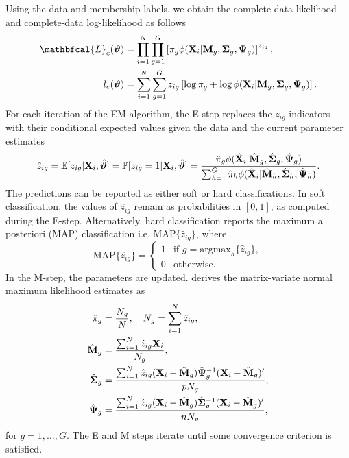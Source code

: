 \documentclass[12pt]{report}
\begin{document}
Using the data and membership labels, we obtain the complete-data likelihood and complete-data log-likelihood as follows
\begin{align*}
\mathbfcal{L}_c(\bm{\vartheta}) &= \prod_{i=1}^N \prod_{g=1}^G \left[ \pi_g \phi({\bf X}_i | {\bf M}_g, {\bf \Sigma}_g, {\bf \Psi}_g) \right] ^{z_{ig}}, \\
l_c(\bm{\vartheta}) &= \sum_{i=1}^N \sum_{g=1}^G z_{ig} \left[ \log \pi_g + \log \phi({\bf X}_i | {\bf M}_g, {\bf \Sigma}_g, {\bf \Psi}_g) \right].
\end{align*}
For each iteration of the EM algorithm, the E-step replaces the $z_{ig}$ indicators with their conditional expected values given the data and the current parameter estimates
\begin{equation*}
\hat{z}_{ig} = \mathbb{E}[z_{ig} | {\bf X}_i, \hat{\bm{\vartheta}}] = \mathbb{P}[z_{ig} = 1 | {\bf X}_i, \hat{\bm{\vartheta}}] = \frac{\hat{\pi}_g \phi(\hat{\bf {X}}_i |\hat{\bf {M}}_g, \hat{\bf {\Sigma}}_g, \hat{\bf{\Psi}}_g)}{\sum_{h=1}^G \hat{\pi}_h \phi(\hat{\bf {X}}_i |\hat{\bf {M}}_h, \hat{\bf {\Sigma}}_h, \hat{\bf{\Psi}}_h)}.
\end{equation*}
The predictions can be reported as either soft or hard classifications. In soft classification, the values of $\hat{z}_{ig}$ remain as probabilities in $[0, 1]$, as computed during the E-step. Alternatively, hard classification reports the maximum a posteriori (MAP) classification i.e, $\text{MAP}\{ \hat{z}_{ig}\}$, where 
\begin{equation*}
\text{MAP}\{ \hat{z}_{ig}\} = 
\begin{cases}
    1 & \text{if $g = \text{argmax}_h \{ \hat{z}_{ig}\}$}, \\
    0 & \text{otherwise}.
\end{cases}
\end{equation*}
In the M-step, the parameters are updated. \citet{viroli2011} derives the matrix-variate normal maximum likelihood estimates as
\[
\begin{aligned}
\hat{\pi}_g & = \frac{N_g}{N}, \quad N_g = \sum_{i=1}^N \hat{z}_{ig}, \\
\hat{{\bf M}}_g & = \frac{\sum_{i=1}^N \hat{z}_{ig}{\bf X}_i}{N_g}, \\
\hat{{\bf \Sigma}}_g & = \frac{\sum_{i=1}^N \hat{z}_{ig}({\bf X}_i - \hat{\bf M}_g) \hat{\bf \Psi}_g^{-1}({\bf X}_i - \hat{\bf M}_g)'}{pN_g}, \\
\hat{{\bf \Psi}}_g & = \frac{\sum_{i=1}^N \hat{z}_{ig}({\bf X}_i - \hat{\bf M}_g) \hat{\bf \Sigma}_g^{-1}({\bf X}_i - \hat{\bf M}_g)'}{nN_g},
\end{aligned}
\]
for $g = 1, \dots, G$. The E and M steps iterate until some convergence criterion is satisfied.
\end{document}
